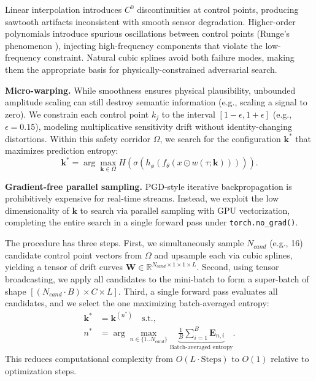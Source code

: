 \documentclass[sigconf, screen, review, anonymous]{acmart}
\theoremstyle{plain}
\theoremstyle{definition}
\theoremstyle{remark}
\begin{document}
Linear interpolation introduces $C^0$ discontinuities at control points, producing sawtooth artifacts inconsistent with smooth sensor degradation. Higher-order polynomials introduce spurious oscillations between control points (Runge's phenomenon \citep{unser1999splines}), injecting high-frequency components that violate the low-frequency constraint. Natural cubic splines avoid both failure modes, making them the appropriate basis for physically-constrained adversarial search.

	\textbf{Micro-warping.}
	While smoothness ensures physical plausibility, unbounded amplitude scaling can still destroy semantic information (e.g., scaling a signal to zero). We constrain each control point $k_j$ to the interval $[1-\epsilon, 1+\epsilon]$ (e.g., $\epsilon=0.15$), modeling multiplicative sensitivity drift without identity-changing distortions. Within this safety corridor $\Omega$, we search for the configuration $\mathbf{k}^*$ that maximizes prediction entropy:
	\begin{equation}
		\mathbf{k}^* = \arg\max_{\mathbf{k} \in \Omega} H\left( \sigma(h_\phi(f_\theta(x \odot 	w(\tau; \mathbf{k})))) \right).
		\label{eq:adv_attack}
	\end{equation}

\textbf{Gradient-free parallel sampling.}
PGD-style iterative backpropagation is prohibitively expensive for real-time streams. Instead, we exploit the low dimensionality of $\mathbf{k}$ to search via parallel sampling with GPU vectorization, completing the entire search in a single forward pass under \texttt{torch.no\_grad()}.

The procedure has three steps. First, we simultaneously sample $N_{cand}$ (e.g., 16) candidate control point vectors from $\Omega$ and upsample each via cubic splines, yielding a tensor of drift curves $\mathbf{W} \in \mathbb{R}^{N_{cand} \times 1 \times 1 \times L}$. Second, using tensor broadcasting, we apply all candidates to the mini-batch to form a super-batch of shape $[(N_{cand} \cdot B) \times C \times L]$. Third, a single forward pass evaluates all candidates, and we select the one maximizing batch-averaged entropy:
\begin{equation}
	\begin{split}
		\mathbf{k}^* &= \mathbf{k}^{(n^*)} \quad \text{s.t.}, \\
		n^* &= \arg\max_{n \in \{1..N_{cand}\}} \underbrace{\frac{1}{B} \sum_{i=1}^B \mathbf{E}_{n,i}}_{\text{Batch-averaged entropy}}.
	\end{split}
\end{equation}
This reduces computational complexity from $O(L \cdot \text{Steps})$ to $O(1)$ relative to optimization steps.
\end{document}
